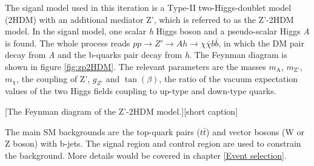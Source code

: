 \documentclass[class=NCU_thesis, crop=false]{standalone}
\begin{document}
	The siganl model used in this iteration is a Type-II two-Higgs-doublet model (2HDM) with an additional mediator Z', which is referred to as the Z'-2HDM model. In the siganl model, one scalar \textit{h} Higgs boson and a pseudo-scalar Higgs \textit{A} is found. The whole process reads $pp \rightarrow Z' \rightarrow Ah \rightarrow \chi \bar{\chi} b \bar{b}$, in which the DM pair decay from \textit{A} and the b-quarks pair decay from \textit{h}. The Feynman diagram is shown in figure \ref{fig:zp2HDM}. The relevant parameters are the masses $m_{\mathrm{A}}$, $m_{\mathrm{Z'}}$, $m_{\chi}$, the coupling of Z', $g_{Z'}$ and $\tan(\beta)$, the ratio of the vacuum expectation values of the two Higgs fields coupling to up-type and down-type quarks.
	
	[The Feynman diagram of the Z'-2HDM model.][short caption]
	
	The main SM backgrounds are the top-quark pairs ($t\bar{t}$) and vector bosons (W or Z boson) with b-jets. The signal region and control region are used to constrain the background. More details would be covered in chapter \ref{Event selection}.
\end{document}
